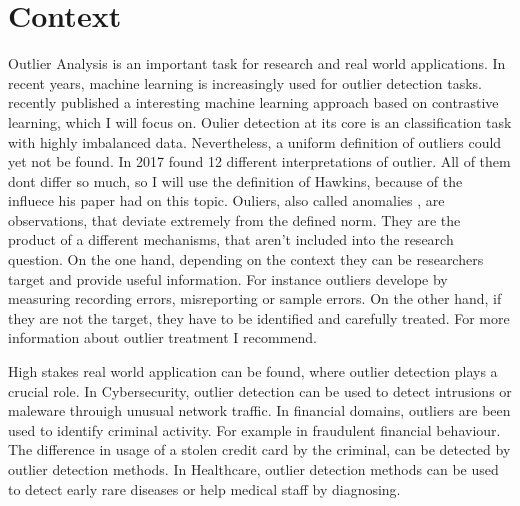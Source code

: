 \section{Context}
Outlier Analysis is an important task for research and real world applications.
In recent years, machine learning is increasingly used for outlier detection tasks.
\citep{shenkar2022anomaly} recently published a interesting machine learning approach based on contrastive learning, which I will focus on.
Oulier detection at its core is an classification task with highly imbalanced data.
Nevertheless, a uniform definition of outliers could yet not be found. In 2017 \citet{ayadi2017outlier} found 12 different interpretations of outlier.
All of them dont differ so much, so I will use the definition of Hawkins, because of the influece his paper had on this topic.
Ouliers, also called anomalies \citep{chandola2009anomaly}, are observations, that deviate extremely from the defined norm.
They are the product of a different mechanisms, that aren't included into the research question. \citep{hawkins1980identification}
On the one hand, depending on the context they can be researchers target and provide useful information.
For instance outliers develope by measuring recording errors, misreporting or sample errors.
On the other hand, if they are not the target, they have to be identified and carefully treated. \citep{smiti2020critical}
For more information about outlier treatment I recommend.

High stakes real world application can be found, where outlier detection plays a crucial role.
In Cybersecurity, outlier detection can be used to detect intrusions or maleware throuigh unusual network traffic.
In financial domains, outliers are been used to identify criminal activity.
For example in fraudulent financial behaviour.
The difference in usage of a stolen credit card by the criminal, can be detected by outlier detection methods. \citep{rezapour2019anomaly}
In Healthcare, outlier detection methods can be used to detect early rare diseases or help medical staff by diagnosing. 


